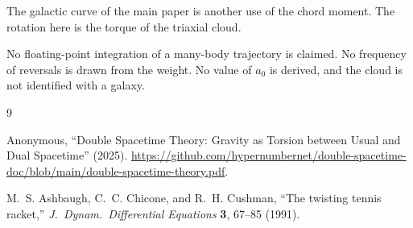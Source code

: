 \documentclass[a4paper]{article}
\begin{document}
The galactic curve of the main paper is another use of the chord moment. The rotation here is the torque of the triaxial cloud.

No floating-point integration of a many-body trajectory is claimed. No frequency of reversals is drawn from the weight. No value of \(a_0\) is derived, and the cloud is not identified with a galaxy.

\begin{thebibliography}{9}
\raggedright

Anonymous,
``Double Spacetime Theory: Gravity as Torsion between Usual and Dual Spacetime'' (2025).
\url{https://github.com/hypernumbernet/double-spacetime-doc/blob/main/double-spacetime-theory.pdf}.

M.~S. Ashbaugh, C.~C. Chicone, and R.~H. Cushman,
``The twisting tennis racket,''
\textit{J.\ Dynam.\ Differential Equations} \textbf{3}, 67--85 (1991).

\end{thebibliography}
\end{document}
